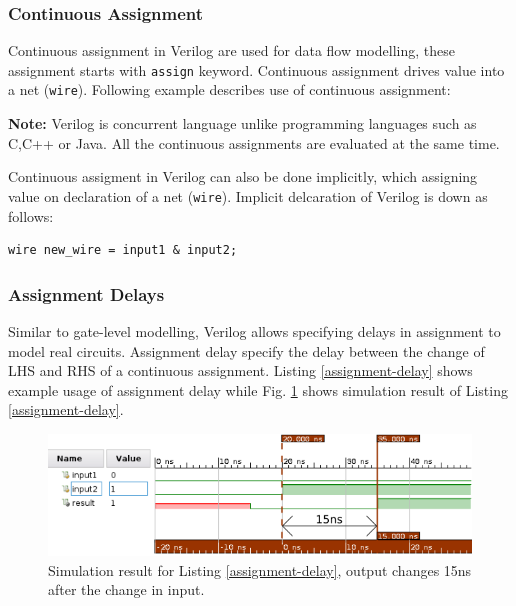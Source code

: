 \documentclass[a4paper,10pt]{article}
\theoremstyle{mytheor}
\newcommand{
  \insertverilog}[3]{
  
}
\begin{document}
\subsubsection*{Continuous Assignment}
Continuous assignment in Verilog are used for data flow modelling, these assignment starts with \lstinline[style=verilog-inline-style]{assign} keyword. Continuous assignment drives value into a net (\lstinline[style=verilog-inline-style]{wire}). Following example describes use of continuous assignment:

{\color{red}\textbf{Note:}} Verilog is concurrent language unlike programming languages such as C,C++ or Java. All the continuous assignments are evaluated at the same time. 
\insertverilog{./verilog_files/continuousAssignment.v}{continuous-assignment}{Example usage of continuous assignment.}

Continuous assigment in Verilog can also be done implicitly, which assigning value on declaration of a net (\lstinline[style=verilog-inline-style]{wire}). Implicit delcaration of Verilog is down as follows:
\begin{lstlisting}[style=verilog-inline-style,xleftmargin=.25\textwidth]
  wire new_wire = input1 & input2;
\end{lstlisting}

\subsubsection*{Assignment Delays}
Similar to gate-level modelling, Verilog allows specifying delays in assignment to model real circuits. Assignment delay specify the delay between the change of LHS and RHS of a continuous assignment. Listing \ref{assignment-delay} shows example usage of assignment delay while Fig. \ref{assignment-delay-sim} shows simulation result of Listing \ref{assignment-delay}.

\insertverilog{./verilog_files/assignmentDelay.v}{assignment-delay}{Using assignment delay in Verilog.}

\begin{figure}[!h] \centering  
  \includegraphics[width=0.8\linewidth]{./resources/assignmentDelay.png}
  \caption{Simulation result for Listing \ref{assignment-delay}, output changes 15ns after the change in input.} 
  \label{assignment-delay-sim}
\end{figure}
\end{document}
